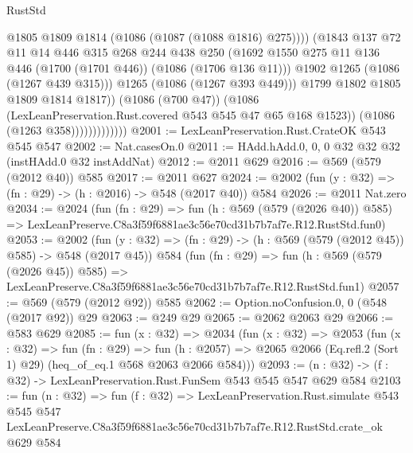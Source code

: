 \begin{lexlean}{RustStd}
\begin{coremodule}
                                    @1805
                                    @1809
                                    @1814
                                    (@1086 (@1087 (@1088 @1816) @275))))
                                (@1843
                                  @137
                                  @72
                                  @11
                                  @14
                                  @446
                                  @315
                                  @268
                                  @244
                                  @438
                                  @250
                                  (@1692
                                    @1550
                                    @275
                                    @11
                                    @136
                                    @446
                                    (@1700 (@1701 @446))
                                    (@1086 (@1706 @136 @11)))
                                  @1902
                                  @1265
                                  (@1086 (@1267 @439 @315)))
                                @1265
                                (@1086 (@1267 @393 @449)))
                              @1799
                              @1802
                              @1805
                              @1809
                              @1814
                              @1817))
                          (@1086 (@700 @47))
                          (@1086 (LexLeanPreservation.Rust.covered @543 @545 @47 @65 @168 @1523))
                          (@1086 (@1263 @358)))))))))))))
@2001 := LexLeanPreservation.Rust.CrateOK @543 @545 @547
@2002 := Nat.casesOn.{0}
@2011 := HAdd.hAdd.{0, 0, 0} @32 @32 @32 (instHAdd.{0} @32 instAddNat)
@2012 := @2011 @629
@2016 := @569 (@579 (@2012 @40)) @585
@2017 := @2011 @627
@2024 := @2002 (fun (y : @32) => (fn : @29) -> (h : @2016) -> @548 (@2017 @40)) @584
@2026 := @2011 Nat.zero
@2034 := @2024
    (fun (fn : @29) =>
    fun (h : @569 (@579 (@2026 @40)) @585) =>
    LexLeanPreserve.C8a3f59f6881ae3c56e70cd31b7b7af7e.R12.RustStd.fun0)
@2053 := @2002
    (fun (y : @32) => (fn : @29) -> (h : @569 (@579 (@2012 @45)) @585) -> @548 (@2017 @45))
    @584
    (fun (fn : @29) =>
    fun (h : @569 (@579 (@2026 @45)) @585) =>
    LexLeanPreserve.C8a3f59f6881ae3c56e70cd31b7b7af7e.R12.RustStd.fun1)
@2057 := @569 (@579 (@2012 @92)) @585
@2062 := Option.noConfusion.{0, 0} (@548 (@2017 @92)) @29
@2063 := @249 @29
@2065 := @2062 @2063 @29
@2066 := @583 @629
@2085 := fun (x : @32) =>
  @2034
    (fun (x : @32) =>
    @2053
      (fun (x : @32) =>
      fun (fn : @29) =>
      fun (h : @2057) =>
      @2065 @2066 (Eq.refl.{2} (Sort 1) @29) (heq_of_eq.{1} @568 @2063 @2066 @584)))
@2093 := (n : @32) -> (f : @32) -> LexLeanPreservation.Rust.FunSem @543 @545 @547 @629 @584
@2103 := fun (n : @32) =>
  fun (f : @32) =>
  LexLeanPreservation.Rust.simulate
    @543
    @545
    @547
    LexLeanPreserve.C8a3f59f6881ae3c56e70cd31b7b7af7e.R12.RustStd.crate_ok
    @629
    @584
\end{coremodule}
\end{lexlean}
